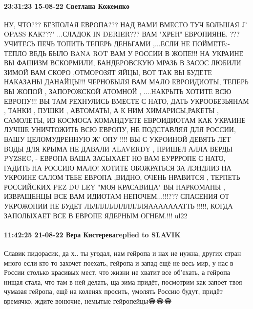  
 
 
 
 

\paragraph{23:31:23 15-08-22 Светлана Кожемяко}

\obeycr
НУ, ЧТО??? БЕЗПОЛАЯ ЕВРОПА???
НАД ВАМИ ВМЕСТО ТУЧ
БОЛЬШАЯ J' OPASS
КАК???" ...СЛАДОК IN DERIER??? ВАМ "ХРЕН" ЕВРОПИЯНЕ. ???
УЧИТЕСЬ ПЕЧЬ ТОПИТЬ ТЕПЕРЬ
ДЕНЬГАМИ ,...ЕСЛИ НЕ ПОЙМЕТЕ:-
ТЕПЛО ВЕДЬ БЫЛО BANA ROT
ВАМ У РОССИИ В ЖОПЕ!!!
НА УКРАИНЕ ВЫ ФАШИЗМ ВСКОРМИЛИ,
БАНДЕРОВСКУЮ МРАЗЬ В ЗАСОС
ЛЮБИЛИ
ЗИМОЙ ВАМ СКОРО ,ОТМОРОЗЯТ ЯЙЦЫ,
ВОТ ТАК ВЫ БУДЕТЕ НАКАЗАНЫ ДАНАЙЦЫ!!!
ЧЕРНОБЫЛЯ ВАМ МАЛО ЕВРОИДИОТЫ,
ТЕПЕРЬ ВЫ ЖОПОЙ , ЗАПОРОЖСКОЙ АТОМНОЙ ,
....НАКРЫТЬ ХОТИТЕ ВСЮ ЕВРОПУ!!!
ВЫ ТАМ РЕХНУЛИСЬ ВМЕСТЕ С НАТО,
ДАТЬ УКРООБЕЗЬЯНАМ , ТАНКИ , ПУШКИ , АВТОМАТЫ,
А К НИМ ХИМАРИСЫ,РАКЕТЫ , САМОЛЕТЫ,
ИЗ КОСМОСА КОМАНДУЕТЕ ЕВРОИДИОТАМ
КАК УКРАИНЕ ЛУЧШЕ УНИЧТОЖИТЬ
ВСЮ ЕВРОПУ, НЕ ПОДСТАВЛЯЯ ДЛЯ РОССИИ, ВАШУ ЦЕЛОМУДРЕННУЮ
Ж' ОПУ !!!!
ВЫ С УКРОИНОЙ ДЕВЯТЬ ЛЕТ
ВОДЫ ДЛЯ КРЫМА НЕ ДАВАЛИ
ALAVERDY , ПРИШЕЛ АЛЛА ВЕРДЫ
PYZSEC, - ЕВРОПА ВАША ЗАСЫХАЕТ
НО ВАМ ЕУРРРОПЕ С НАТО,
ГАДИТЬ НА РОССИЮ МАЛО!
ХОТИТЕ ОБОЖРАТЬСЯ
ЗА ЛЭНДЛИЗ НА УКРОИНЕ САЛОМ
ТЕБЕ ЕВРОПА ,ВИДНО,
ОЧЕНЬ НРАВИТСЯ ,
ТЕРПЕТЬ РОССИЙСКИХ
PEZ DU LEY
"МОЯ КРАСАВИЦА"
ВЫ НАРКОМАНЫ , ИЗВРАЩЕНЦЫ
ВСЕ ВАМ ИДИОТАМ НЕПОЧЕМ...!!!???
СПАСЕНИЯ ОТ УКРОЖОПИИ НЕ БУДЕТ
ЛЬЛЛЛЛЛЛЛЛЛЛЛЯАААААААТТЬ !!!!!,
КОГДА ЗАПОЛЫХАЕТ ВСЕ В ЕВРОПЕ
ЯДЕРНЫМ ОГНЕМ.!!!
ul22
\restorecr

\paragraph{11:42:25 21-08-22 Вера Кистереваreplied to SLAVIK}

Славик пидорасик, да х.. ты угодал, нам гейропа и нах не нужна, других стран
много если кто то захочет поехать, гейропа и запад ещё не весь мир, у нас в
России столько красивых мест, что жизни не хватит все об'ехать, а гейропа нищая
стала, что там в ней делать, ща зима придёт, посмотрим как запоет твоя чумазая
гейропа, ещё на коленях просить, умолять Россию будут, придёт времячко, ждите
вонючие, немытые гейропейцы😂😂😂

